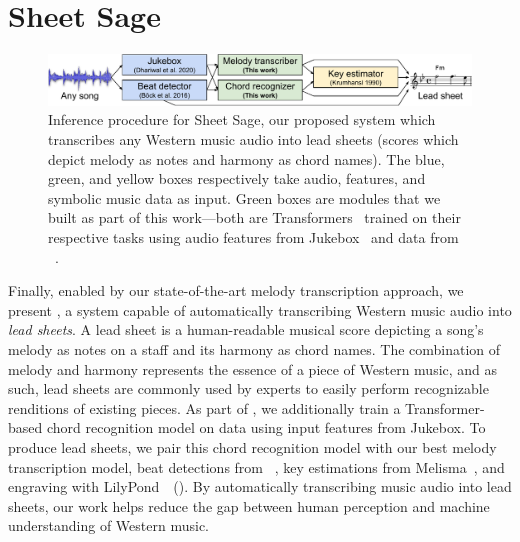 \section{Sheet Sage}
\label{sec:sheetsage}

\begin{figure}
    \centering
    \includegraphics[width=\linewidth]{figs/sheet_sage.pdf}
    \caption{
    Inference procedure for Sheet Sage, our proposed system which transcribes any Western music audio into lead sheets (scores which depict melody as notes and harmony as chord names). The blue, green, and yellow boxes respectively take audio, features, and symbolic music data as input. Green boxes are modules that we built as part of this work---both are Transformers~\cite{vaswani2017attention} trained on their respective tasks using audio features from Jukebox~\cite{dhariwal2020jukebox} and data from \hooktheory~\cite{hooktheory}.}
    \label{fig:sheet_sage}
\end{figure}

 Finally, enabled by our state-of-the-art melody transcription approach, we present \emph{\sheetsage}, a system capable of automatically transcribing Western music audio into \emph{lead sheets}. 
A lead sheet is a human-readable musical score depicting a song's melody as notes on a staff and its harmony as chord names. 
The combination of melody and harmony represents the essence of a piece of Western music, and as such, lead sheets are commonly used by experts to easily perform recognizable renditions of existing pieces. 
As part of \sheetsage, we additionally train a Transformer-based chord recognition model on \hooktheory{} data using input features from Jukebox. 
To produce lead sheets, we pair this chord recognition model with our best melody transcription model, beat detections from \madmom~\cite{bock2016madmom,bock2016joint}, key estimations from Melisma~\cite{krumhansl1990cognitive,temperley1999key,sleator2001melisma}, and engraving with LilyPond~\cite{nienhuys2003lilypond}~(). 
By automatically transcribing music audio into lead sheets, our work helps reduce the gap between human perception and machine understanding of Western music.

